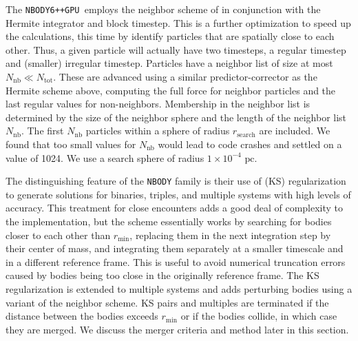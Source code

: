 \documentclass{princeton_astro_thesis}
\newcommand\pc{\mbox{ pc}}
\newcommand\nbody{\texttt{NBODY6++GPU }}
\numberwithin{equation}{section}
\begin{document}
The \nbody employs the neighbor scheme of \citet{1973Ahmad} in conjunction with the Hermite integrator and block timestep. This is a further optimization to speed up the calculations, this time by identify particles that are spatially close to each other. Thus, a given particle will actually have two timesteps, a regular timestep and (smaller) irregular timestep. Particles have a neighbor list of size at most $N_{\mathrm{nb}} \ll N_{\mathrm{tot}}$.  These are advanced using a similar predictor-corrector as the Hermite scheme above, computing the full force for neighbor particles and the last regular values for non-neighbors. Membership in the neighbor list is determined by the size of the neighbor sphere and the length of the neighbor list $N_{\mathrm{nb}}$.  The first $N_{\mathrm{nb}}$ particles within a sphere of radius $r_{\mathrm{search}}$ are included.  We found that too small values for $N_{\mathrm{nb}}$ would lead to code crashes and settled on a value of 1024.  We use a search sphere of radius $1 \times 10^{-4} \pc$.

The distinguishing feature of the \texttt{NBODY} family is their use of \citet{1965Kusta} (KS) regularization to generate solutions for binaries, triples, and multiple systems with high levels of accuracy.  This treatment for close encounters adds a good deal of complexity to the implementation, but the scheme essentially works by searching for bodies closer to each other than $r_{\mathrm{min}}$, replacing them in the next integration step by their center of mass, and integrating them separately at a smaller timescale and in a different reference frame. This is useful to avoid numerical truncation errors caused by bodies being too close in the originally reference frame. The KS regularization is extended to multiple systems and adds perturbing bodies using a variant of the \citet{1973Ahmad} neighbor scheme. KS pairs and multiples are terminated if the distance between the bodies exceeds $r_{\mathrm{min}}$ or if the bodies collide, in which case they are merged.  We discuss the merger criteria and method later in this section.
\end{document}
